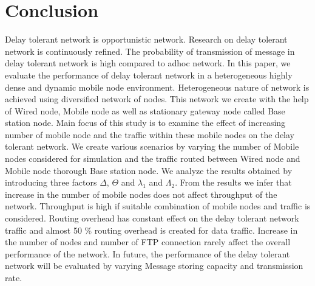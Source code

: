 \documentclass[3p,times]{elsarticle}
\begin{document}
\section{Conclusion}\label{conl}
Delay tolerant network is opportunistic network. Research on delay tolerant network is continuously refined. The probability of transmission of message in delay tolerant network is high compared to adhoc network. In this paper, we evaluate the performance of delay tolerant network in a heterogeneous highly dense and dynamic mobile node environment. Heterogeneous nature of network is achieved using diversified network of nodes. This network we create with the help of Wired node, Mobile node as well as stationary gateway node called Base station node. Main focus of this study is to examine the effect of increasing number of mobile node and the traffic within these mobile nodes on the delay tolerant network. We create various scenarios by varying the number of Mobile nodes considered for simulation and the traffic routed between Wired node and Mobile node thorough Base station node. We analyze the results obtained by introducing three factors $\Delta$, $\Theta$ and $\lambda_1 $ and $\Lambda_2$. From the results we infer that increase in the number of mobile nodes does not affect throughput of the network. Throughput is high if suitable combination of mobile nodes and traffic is considered. Routing overhead has constant effect on the delay tolerant network traffic and almost 50 \% routing overhead is created for data traffic. Increase in the number of nodes and number of FTP connection rarely affect the overall performance of the network. In future, the performance of the delay tolerant network will be evaluated by varying Message storing capacity and transmission rate.  
\end{document}
